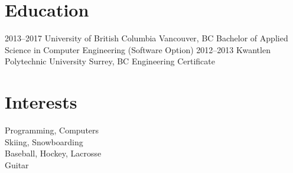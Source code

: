 \documentclass[]{friggeri-cv} %
\begin{document}

\section{Education}

\begin{entrylist}
\entry
{2013--2017}
{University of British Columbia}
{Vancouver, BC}
{Bachelor of Applied Science in Computer Engineering (Software Option)}
\entry
{2012--2013}
{Kwantlen Polytechnic University} %
{Surrey, BC}
{Engineering Certificate}
\end{entrylist}






\section{Interests}

Programming, Computers \\
Skiing, Snowboarding \\
Baseball, Hockey, Lacrosse \\
Guitar \\
\end{document}
